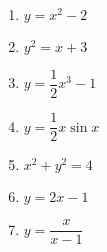 \begin{previewactivity}
\begin{multicols}{2}
\begin{enumerate}
\item $y = x^2  - 2$

\item $y^2  = x + 3$

\item $y = \dfrac{1}{2}x^3  - 1$

\item $y = \dfrac{1}{2} x\sin x$

\item $x^2  + y^2  = 4$

\item $y = 2x - 1$

\item $y = \dfrac{x}{{x - 1}}$

\end{enumerate}
\end{multicols}
\end{previewactivity}
\hbreak
